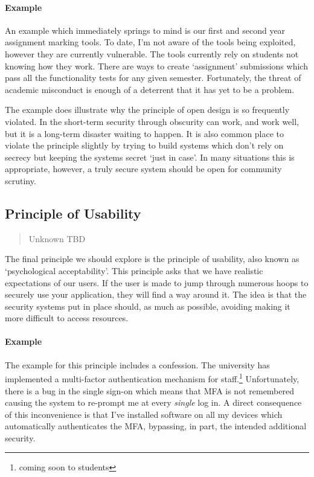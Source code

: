 \paragraph{Example}
An example which immediately springs to mind is our first and second year assignment marking tools.
To date, I'm not aware of the tools being exploited, however they are currently vulnerable.
The tools currently rely on students not knowing how they work.
There are ways to create `assignment' submissions which pass all the functionality tests for any given semester.
Fortunately, the threat of academic misconduct is enough of a deterrent that it has yet to be a problem.

The example does illustrate why the principle of open design is so frequently violated.
In the short-term security through obscurity can work, and work well, but it is a long-term disaster waiting to happen.
It is also common place to violate the principle slightly by trying to build systems which don't rely on secrecy but keeping the systems secret `just in case'.
In many situations this is appropriate, however, a truly secure system should be open for community scrutiny.

\subsection{Principle of Usability}

\begin{quote}{Unknown}
TBD
\end{quote}

The final principle we should explore is the principle of usability, also known as `psychological acceptability'.
This principle asks that we have realistic expectations of our users.
If the user is made to jump through numerous hoops to securely use your application, they will find a way around it.
The idea is that the security systems put in place should, as much as possible, avoiding making it more difficult to access resources.

\paragraph{Example}
The example for this principle includes a confession.
The university has implemented a multi-factor authentication mechanism for staff.\footnote{coming soon to students}
Unfortunately, there is a bug in the single sign-on which means that MFA is not remembered causing the system to re-prompt me at every \textsl{single} log in.
A direct consequence of this inconvenience is that I've installed software on all my devices which automatically authenticates the MFA,
bypassing, in part, the intended additional security.

